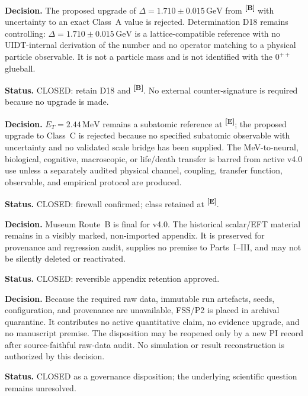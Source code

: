 \documentclass[12pt,a4paper,twoside]{article}
\theoremstyle{plain}
\theoremstyle{definition}
\theoremstyle{remark}
\newcommand{\GeV}{\,\mathrm{GeV}}
\newcommand{\MeV}{\,\mathrm{MeV}}
\newcommand{\catmark}[1]{\textsuperscript{\textsf{\textbf{[#1]}}}}
\newcommand{\DeltaGap}{1.710 \pm 0.015\GeV} %
\newcommand{\ETorsion}{2.44\MeV} %
\begin{document}
\begin{pioverridebox}
\label{box:pi-decision-d21-delta}
\textbf{Decision.} The proposed upgrade of $\Delta=\DeltaGap$ from
\catmark{B} with uncertainty to an exact Class~A value is rejected.
Determination D18 remains controlling: $\Delta=1.710\pm0.015\,\mathrm{GeV}$
is a lattice-compatible reference with no UIDT-internal derivation of the
number and no operator matching to a physical particle observable. It is not
a particle mass and is not identified with the $0^{++}$ glueball.

\textbf{Status.} CLOSED: retain D18 and \catmark{B}. No external
counter-signature is required because no upgrade is made.
\end{pioverridebox}

\begin{pioverridebox}
\label{box:pi-decision-d22-et}
\textbf{Decision.} $E_T=\ETorsion$ remains a subatomic reference at
\catmark{E}; the proposed upgrade to Class~C is rejected because no
specified subatomic observable with uncertainty and no validated scale bridge
has been supplied. The MeV-to-neural, biological, cognitive, macroscopic, or
life/death transfer is barred from active v4.0 use unless a separately audited
physical channel, coupling, transfer function, observable, and empirical
protocol are produced.

\textbf{Status.} CLOSED: firewall confirmed; class retained at \catmark{E}.
\end{pioverridebox}

\begin{pioverridebox}
\label{box:pi-decision-d23-museum}
\textbf{Decision.} Museum Route~B is final for v4.0. The historical scalar/EFT
material remains in a visibly marked, non-imported appendix. It is preserved
for provenance and regression audit, supplies no premise to Parts~I--III, and
may not be silently deleted or reactivated.

\textbf{Status.} CLOSED: reversible appendix retention approved.
\end{pioverridebox}

\begin{pioverridebox}
\label{box:pi-decision-d24-p2}
\textbf{Decision.} Because the required raw data, immutable run artefacts,
seeds, configuration, and provenance are unavailable, FSS/P2 is placed in
archival quarantine. It contributes no active quantitative claim, no evidence
upgrade, and no manuscript premise. The disposition may be reopened only by a
new PI record after source-faithful raw-data audit. No simulation or result
reconstruction is authorized by this decision.

\textbf{Status.} CLOSED as a governance disposition; the underlying
scientific question remains unresolved.
\end{pioverridebox}
\end{document}
